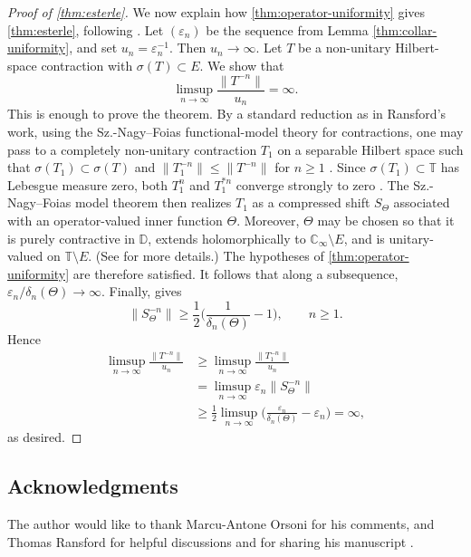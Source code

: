 \documentclass[11pt]{amsart}
\numberwithin{equation}{section}
\theoremstyle{definition}
\newcommand{\D}{\mathbb D}
\newcommand{\T}{\mathbb T}
\newcommand{\C}{\mathbb C}
\newcommand{\eps}{\varepsilon}
\begin{document}
\begin{proof}[Proof of \cref{thm:esterle}]
We now explain how \cref{thm:operator-uniformity} gives \cref{thm:esterle}, following \cite{Ransford}.
Let $(\eps_n)$ be the sequence from Lemma
\ref{thm:collar-uniformity}, and set
$
        u_n=\eps_n^{-1}.
$
Then $u_n\to\infty$.
Let $T$ be a non-unitary Hilbert-space contraction with
$\sigma(T)\subset E$.  We show that
$$
        \limsup_{n\to\infty}\frac{\|T^{-n}\|}{u_n}=\infty.
$$
This is enough to prove the theorem.
By a standard reduction as in Ransford's work, using the Sz.-Nagy--Foias functional-model theory for contractions, one may pass to a completely non-unitary
contraction $T_1$ on a separable Hilbert space such that
$\sigma(T_1)\subset\sigma(T)$ and
$
        \|T_1^{-n}\|\le\|T^{-n}\|$ for $n\geq 1$ \cite[Lemma 6.1]{Ransford}.
Since $\sigma(T_1)\subset\T$ has Lebesgue measure zero, both $T_1^n$ and
$T_1^{*n}$ converge strongly to zero \cite[Lemma 6.2]{Ransford}.  The Sz.-Nagy--Foias model theorem then
realizes $T_1$ as a compressed shift $S_\Theta$ associated with an
operator-valued inner function $\Theta$.  Moreover, $\Theta$ may be chosen
so that it is purely contractive in $\D$, extends holomorphically to
$\C_\infty\setminus E$, and is unitary-valued on $\T\setminus E$. (See \cite[Section 5]{Ransford} for more details.) The hypotheses of \cref{thm:operator-uniformity} are therefore satisfied. It follows that
along a subsequence, $\eps_n/\delta_n(\Theta)\to\infty$.  
Finally, \cite[Theorem 5.5]{Ransford} gives
$$
        \|S_\Theta^{-n}\|
        \ge
        \frac12\Big(\frac1{\delta_n(\Theta)}-1\Big),
        \qquad n\geq 1.
$$
Hence
$$
\begin{aligned}
        \limsup_{n\to\infty}\frac{\|T^{-n}\|}{u_n}
        &\ge
        \limsup_{n\to\infty}\frac{\|T_1^{-n}\|}{u_n} \\
        &=
        \limsup_{n\to\infty}\eps_n\|S_\Theta^{-n}\| \\
        &\ge
        \frac12\limsup_{n\to\infty}
        \Big(\frac{\eps_n}{\delta_n(\Theta)}-\eps_n\Big)
        =\infty,
\end{aligned} 
$$ 
as desired.
\end{proof}


\subsection*{Acknowledgments} The author would like to thank Marcu-Antone Orsoni for his comments, and Thomas Ransford for helpful discussions and for sharing his manuscript \cite{Ransford2}.





\end{document}
